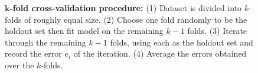 \begin{figure}[htbp]
    \centering
    
    \captionsetup{format=hang} %
    \caption{
        $\bm{k}$\textbf{-fold cross-validation procedure:} (1) Dataset is divided into
        $k$-folds of roughly equal size. (2) Choose one fold randomly to be the
        holdout set then fit model on the remaining $k-1$ folds. (3) Iterate
        through the remaining $k-1$ folds, using each as the holdout set and
        record the error $e_i$ of the iteration. (4) Average the errors obtained
        over the $k$-folds.
    }
    \label{fig:kfold-cv}
\end{figure}

%
%
%
%




